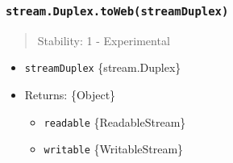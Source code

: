 \subsubsection{\texorpdfstring{\texttt{stream.Duplex.toWeb(streamDuplex)}}{stream.Duplex.toWeb(streamDuplex)}}\label{stream.duplex.towebstreamduplex}

\begin{quote}
Stability: 1 - Experimental
\end{quote}

\begin{itemize}
\tightlist
\item
  \texttt{streamDuplex} \{stream.Duplex\}
\item
  Returns: \{Object\}

  \begin{itemize}
  \tightlist
  \item
    \texttt{readable} \{ReadableStream\}
  \item
    \texttt{writable} \{WritableStream\}
  \end{itemize}
\end{itemize}

